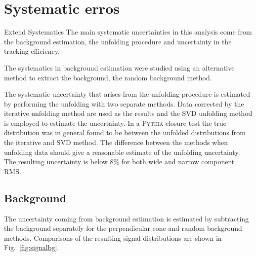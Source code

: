 \section{Systematic erros}
{\color{red} Extend Systematics}
\label{sec:systematicerrors}
The main systematic uncertainties in this analysis come from the background estimation, the unfolding procedure and uncertainty in the tracking efficiency. 


The systematics in background estimation were studied using an alternative method to extract the background, the random background method. %

The systematic uncertainty that arises from the unfolding procedure is estimated by performing the unfolding with two separate methods. Data corrected by the iterative unfolding method are used as the results and the SVD unfolding method is employed to estimate the uncertainty. In a \textsc{Pythia} closure test the true distribution was in general found to be between the unfolded distributions from the iterative and SVD method. The difference between the methods when unfolding data should give a reasonable estimate of the unfolding uncertainty. The resulting uncertainty is below 8\% for both wide and narrow component RMS.



  
 \subsection{Background}
The uncertainty coming from background estimation is estimated by subtracting the background separately for the perpendicular cone and random background methods. Comparisons of the resulting signal distributions are shown in Fig.~\ref{fig:signalbg}. 
 
